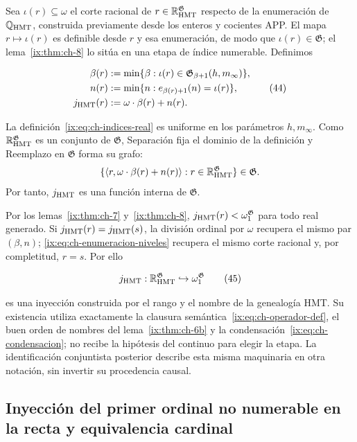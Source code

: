Sea \(\iota(r)\subseteq\omega\) el corte racional de
\(r\in\mathbb R_{\rm HMT}^{\mathfrak G}\) respecto de la enumeración de
\(\mathbb Q_{\rm HMT}\), construida previamente desde los enteros y cocientes
APP. El mapa \(r\mapsto\iota(r)\) es definible desde \(r\) y esa enumeración,
de modo que \(\iota(r)\in\mathfrak G\); el lema~\ref{ix:thm:ch-8} lo sitúa en una etapa de
índice numerable. Definimos

\[
 \begin{aligned}
  \beta(r)&:=\min\{\beta:
       \iota(r)\in\mathfrak G_{\beta+1}(h,m_\infty)\},\\
  n(r)&:=\min\{n:e_{\beta(r)+1}(n)=\iota(r)\},\\
  j_{\rm HMT}(r)&:=\omega\cdot\beta(r)+n(r).
 \end{aligned}
\tag{44}\label{ix:eq:ch-indices-real}
\]

La definición~\eqref{ix:eq:ch-indices-real} es uniforme en los parámetros \(h,m_\infty\). Como
\(\mathbb R_{\rm HMT}^{\mathfrak G}\) es un conjunto de \(\mathfrak G\),
Separación fija el dominio de la definición y Reemplazo en \(\mathfrak G\)
forma su grafo:
\[
 \{\langle r,\omega\cdot\beta(r)+n(r)\rangle:
 r\in\mathbb R_{\rm HMT}^{\mathfrak G}\}\in\mathfrak G.
\]
Por tanto, \(j_{\rm HMT}\) es una función interna de \(\mathfrak G\).

Por los lemas~\ref{ix:thm:ch-7} y~\ref{ix:thm:ch-8},
\(j_{\rm HMT}(r)<\omega_1^{\mathfrak G}\) para todo
real generado. Si \(j_{\rm HMT}(r)=j_{\rm HMT}(s)\), la división ordinal por
\(\omega\) recupera el mismo par \((\beta,n)\); \eqref{ix:eq:ch-enumeracion-niveles} recupera el mismo corte
racional y, por completitud, \(r=s\). Por ello

\[
 j_{\rm HMT}:\mathbb R_{\rm HMT}^{\mathfrak G}
 \hookrightarrow\omega_1^{\mathfrak G}
\tag{45}\label{ix:eq:ch-inyeccion-j}
\]

es una inyección construida por el rango y el nombre de la genealogía HMT. Su
existencia utiliza exactamente la clausura semántica~\eqref{ix:eq:ch-operador-def}, el buen orden de
nombres del lema~\ref{ix:thm:ch-6b} y la condensación~\eqref{ix:eq:ch-condensacion}; no recibe la hipótesis del continuo para elegir la
etapa. La identificación conjuntista posterior describe esta misma
maquinaria en otra notación, sin invertir su procedencia causal.

\subsection{Inyección del primer ordinal no numerable en la recta y equivalencia cardinal}

